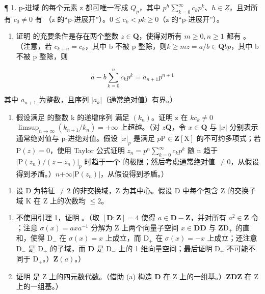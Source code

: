
¶ 1. p-进域  的每个元素 z 都可唯一写成 \(Q_{p}\)，其中 \(p^{h}\sum_{k=0}^{\infty}c_{k}p^{k}\)、\(h\in Z\)，且对所有 \(c_{0}\neq0\) 有 （z 的“p-进展开”）。\(0\leqslant c_{k}<p\)\(k\geqslant0\)（z 的“p-进展开”）。

\begin{enumerate}
\def\labelenumi{(\alph{enumi})}
\tightlist
\item
  证明  的充要条件是存在两个整数 \(z \in \mathbf{Q}\)，使得对所有 \(m \geqslant 0, n \geqslant 1\) 都有 。（注意，若 \(c_{k+n} = c_k\)，其中 b 不被 p 整除，则\(k \geqslant m\)\(z = a / b \in \mathbf{Q}\)\(b\)\(p\)，其中 b 不被 p 整除，则
\end{enumerate}

\[
a - b \sum_ {k = 0} ^ {n} c _ {k} p ^ {k} = a _ {n + 1} p ^ {n + 1}
\]

其中 \(a_{n+1}\) 为整数，且序列 \(|a_k|\)（通常绝对值）有界。）

\begin{enumerate}
\def\labelenumi{(\alph{enumi})}
\setcounter{enumi}{1}
\tightlist
\item
  假设满足  的整数 k 的递增序列  满足 \((k_n)\)。证明 z 在 \(k\)\(c_k \neq 0\)\(\limsup_{n \to \infty} (k_{n+1}/k_n) = +\infty\) 上超越。（对 \(z\)\(\mathbf{Q}\)，令 \(x \in \mathbf{Q}\) 与 \(|x|\) 分别表示通常绝对值与 p-进绝对值。假设 \(|x|_p\) 是满足 \(p\)\(\mathrm{P} \in \mathbf{Z}[\mathrm{X}]\) 的不可约多项式；若 \(\mathrm{P}(z) = 0\)，使用 Taylor 公式证明 \(z_n = p^n \sum_{k=0}^{\infty} c_k p^k\) 随 n 趋于 \(|\mathrm{P}(z_n)/(z - z_n)|_p\) 时趋于一个  的极限；然后考虑通常绝对值 \(\neq 0\)，从假设得到矛盾。）\(n\)\(+\infty\)\(|\mathrm{P}(z_n)|\)，从假设得到矛盾。）
\end{enumerate}

\begin{enumerate}
\def\labelenumi{\arabic{enumi}.}
\setcounter{enumi}{1}
\tightlist
\item
  设 D 为特征 \(\neq2\) 的非交换域，Z 为其中心。假设 D 中每个包含 Z 的交换子域 K 在 Z 上的次数均 \(\leqslant2\)。
\end{enumerate}

\begin{enumerate}
\def\labelenumi{(\alph{enumi})}
\item
  不使用引理 1，证明 。（取 \([\mathbf{D}:\mathbf{Z}] = 4\) 使得 \(a\in \mathbf{D} - \mathbf{Z}\)，并对所有 \(a^2\in \mathbf{Z}\) 令 ；注意 \(\sigma (x) = axa^{-1}\) 分解为 Z 上两个向量子空间 \(x\in \mathbf{D}\)\(\mathbf{D}\) 与 \(\mathbf{Z}\)\(\mathrm{D}_{+}\) 的直和，使得 \(\mathrm{D}_{-}\) 在 \(\sigma (x) = x\) 上成立，而 \(\mathrm{D}_{+}\) 在 \(\sigma (x) = -x\) 上成立；还注意 \(\mathrm{D}_{-}\) 是 \(\mathrm{D}_{+}\) 的子域，而 \(\mathbf{D}\) 是 \(\mathrm{D}_{-}\) 上的 1 维向量空间；最后证明 \(\mathrm{D}_{+}\) 不可能不同于 \(\mathrm{D}_{+}\)。）\(\mathbf{Z}(a)\)。）
\item
  证明  是 Z 上的四元数代数。（借助 (a) 构造 \(\mathbf{D}\) 在 Z 上的一组基。）\(\mathbf{Z}\)\(\mathbf{D}\)\(\mathbf{Z}\) 在 Z 上的一组基。）
\end{enumerate}

